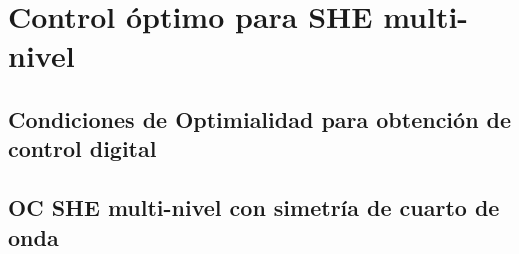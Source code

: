\section{Control óptimo para SHE multi-nivel}

\subsection{Condiciones de Optimialidad para obtención de control digital}

\subsection{OC SHE multi-nivel con simetría de cuarto de onda}